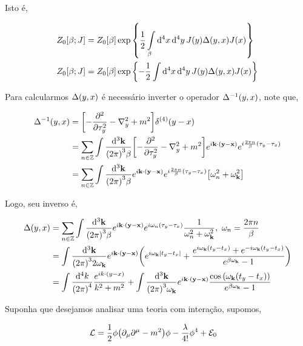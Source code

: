 \documentclass[twoside]{amsart}
\numberwithin{equation}{section}
\begin{document}
Isto é,

\begin{align}
    Z_0\qty[\beta; J]&=Z_0\qty[\beta]\exp\qty{\frac12\int\limits_{\beta}\dd[4]{x}\dd[4]{y}J\qty(y)\Delta\qty(y,x)J\qty(x)}\\
    Z_0\qty[\beta; J]&=Z_0\qty[\beta]\exp\qty{-\frac12\int\limits\dd[4]{x}\dd[4]{y}J\qty(y)\Delta\qty(y,x)J\qty(x)}
\end{align}

Para calcularmos $\Delta\qty(y,x)$ é necessário inverter o operador $\Delta^{-1}\qty(y,x)$, note que,

\begin{align}
    \Delta^{-1}\qty(y,x)&=\qty[-\pdv[2]{}{\tau_y}-\laplacian_y+m^2]\delta^{\qty(4)}\qty(y-x)\\
    &=\sum\limits_{n\in\mathbb Z}\int\frac{\dd[3]{\vb k}}{\qty(2\pi)^3\beta}\qty[-\pdv[2]{}{\tau_y}-\laplacian_y+m^2]e^{i\vb k\cdot\qty(\vb y-\vb x)}e^{i\frac{2\pi n}{\beta}\qty(\tau_y-\tau_x)}\\
    &=\sum\limits_{n\in\mathbb Z}\int\frac{\dd[3]{\vb k}}{\qty(2\pi)^3\beta}e^{i\vb k\cdot\qty(\vb y-\vb x)}e^{i\frac{2\pi n}{\beta}\qty(\tau_y-\tau_x)}\qty[\omega_n^2+\omega_{\vb k}^2]
\end{align}

Logo, seu inverso é,

\begin{align}
    \Delta\qty(y,x)&=\sum\limits_{n\in\mathbb Z}\int\frac{\dd[3]{\vb k}}{\qty(2\pi)^3\beta}e^{i\vb k\cdot\qty(\vb y-\vb x)}e^{i\omega_n\qty(\tau_y-\tau_x)}\frac{1}{\omega_n^2+\omega_{\vb k}^2},\ \omega_n=\frac{2\pi n}{\beta}\\
    &=\int\frac{\dd[3]{\vb k}}{\qty(2\pi)^32\omega_{\vb k}}e^{i\vb k\cdot\qty(\vb y-\vb x)}\qty(e^{i\omega_{\vb k}\abs{t_y-t_x}}+\frac{e^{i\omega_{\vb k}\qty(t_y-t_x)}+e^{-i\omega_{\vb k}\qty(t_y-t_x)}}{e^{\beta\omega_{\vb k}}-1})\\
    &=\int\frac{\dd[4]{ k}}{\qty(2\pi)^4}\frac{e^{i k\cdot\qty( y- x)}}{k^2+m^2}+\int\frac{\dd[3]{\vb k}}{\qty(2\pi)^3\omega_{\vb k}}e^{i\vb k\cdot\qty(\vb y-\vb x)}\frac{\cos\qty(\omega_{\vb k}\qty(t_y-t_x))}{e^{\beta\omega_{\vb k}}-1}
\end{align}

Suponha que desejamos analisar uma teoria com interação, supomos,

\begin{align}
    \mathcal L&=\frac12\phi\qty(\partial_\mu\partial^\mu-m^2)\phi-\frac{\lambda}{4!}\phi^4+\mathcal E_0
\end{align}
\end{document}
